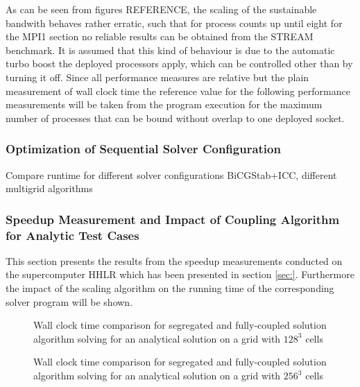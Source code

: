 As can be seen from figures REFERENCE, the scaling of the sustainable bandwith behaves rather erratic, such that for process counts up until eight for the MPI1 section no reliable results can be obtained from the STREAM benchmark. It is assumed that this kind of behaviour is due to the automatic turbo boost the deployed processors apply, which can be controlled other than by turning it off. Since all performance measures are relative but the plain measurement of wall clock time the reference value for the following performance measurements will be taken from the program execution for the maximum number of processes that can be bound without overlap to one deployed socket.

\subsubsection{Optimization of Sequential Solver Configuration}

Compare runtime for different solver configurations BiCGStab+ICC, different multigrid algorithms

\subsubsection{Speedup Measurement and Impact of Coupling Algorithm for Analytic Test Cases}

This section presents the results from the speedup measurements conducted on the supercomputer HHLR which has been presented in section \ref{sec:}. Furthermore the impact of the scaling algorithm on the running time of the corresponding solver program will be shown.

\begin{figure}
\centering
{}
\caption{Wall clock time comparison for segregated and fully-coupled solution algorithm solving for an analytical solution on a grid with $128^3$ cells}
\end{figure}

\begin{figure}
\centering
{}
\caption{Wall clock time comparison for segregated and fully-coupled solution algorithm solving for an analytical solution on a grid with $256^3$ cells}
\end{figure}

